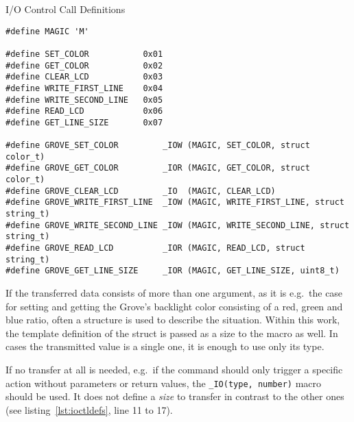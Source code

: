 \begin{listing} [H]
    \caption{I/O Control Call Definitions}
    \label{lst:ioctldefs}
    \begin{verbatim}
#define MAGIC 'M'

#define SET_COLOR           0x01
#define GET_COLOR           0x02
#define CLEAR_LCD           0x03
#define WRITE_FIRST_LINE    0x04
#define WRITE_SECOND_LINE   0x05
#define READ_LCD            0x06
#define GET_LINE_SIZE       0x07

#define GROVE_SET_COLOR         _IOW (MAGIC, SET_COLOR, struct color_t) 
#define GROVE_GET_COLOR         _IOR (MAGIC, GET_COLOR, struct color_t)
#define GROVE_CLEAR_LCD         _IO  (MAGIC, CLEAR_LCD)
#define GROVE_WRITE_FIRST_LINE  _IOW (MAGIC, WRITE_FIRST_LINE, struct string_t)
#define GROVE_WRITE_SECOND_LINE _IOW (MAGIC, WRITE_SECOND_LINE, struct string_t)
#define GROVE_READ_LCD          _IOR (MAGIC, READ_LCD, struct string_t)
#define GROVE_GET_LINE_SIZE     _IOR (MAGIC, GET_LINE_SIZE, uint8_t)
    \end{verbatim}
\end{listing}
%
If the transferred data consists of more than one argument, as it is e.g.\ the case for setting and getting the Grove's backlight color consisting of a red, green and blue ratio, often a structure is used to describe the situation.
Within this work, the template definition of the struct is passed as a size to the macro as well.
In cases the transmitted value is a single one, it is enough to use only its type.

If no transfer at all is needed, e.g.\ if the command should only trigger a specific action without parameters or return values, the \texttt{_IO(type, number)} macro should be used.
It does not define a \textit{size} to transfer in contrast to the other ones (see listing~\ref{lst:ioctldefs}, line 11 to 17).

